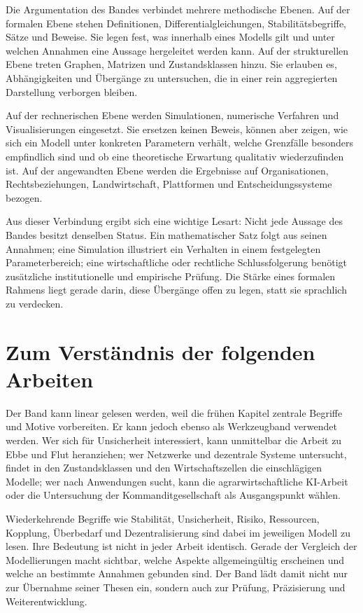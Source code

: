 \documentclass[a4paper, 12pt, twoside, openright]{report}
\theoremstyle{definition}
\theoremstyle{definition}
\begin{document}
Die Argumentation des Bandes verbindet mehrere methodische Ebenen. Auf der
formalen Ebene stehen Definitionen, Differentialgleichungen, Stabilitätsbegriffe,
Sätze und Beweise. Sie legen fest, was innerhalb eines Modells gilt und unter
welchen Annahmen eine Aussage hergeleitet werden kann. Auf der strukturellen
Ebene treten Graphen, Matrizen und Zustandsklassen hinzu. Sie erlauben es,
Abhängigkeiten und Übergänge zu untersuchen, die in einer rein aggregierten
Darstellung verborgen bleiben.

Auf der rechnerischen Ebene werden Simulationen, numerische Verfahren und
Visualisierungen eingesetzt. Sie ersetzen keinen Beweis, können aber zeigen,
wie sich ein Modell unter konkreten Parametern verhält, welche Grenzfälle
besonders empfindlich sind und ob eine theoretische Erwartung qualitativ
wiederzufinden ist. Auf der angewandten Ebene werden die Ergebnisse auf
Organisationen, Rechtsbeziehungen, Landwirtschaft, Plattformen und
Entscheidungssysteme bezogen.

Aus dieser Verbindung ergibt sich eine wichtige Lesart: Nicht jede Aussage des
Bandes besitzt denselben Status. Ein mathematischer Satz folgt aus seinen
Annahmen; eine Simulation illustriert ein Verhalten in einem festgelegten
Parameterbereich; eine wirtschaftliche oder rechtliche Schlussfolgerung benötigt
zusätzliche institutionelle und empirische Prüfung. Die Stärke eines formalen
Rahmens liegt gerade darin, diese Übergänge offen zu legen, statt sie sprachlich
zu verdecken.

\section{Zum Verständnis der folgenden Arbeiten}

Der Band kann linear gelesen werden, weil die frühen Kapitel zentrale Begriffe
und Motive vorbereiten. Er kann jedoch ebenso als Werkzeugband verwendet werden.
Wer sich für Unsicherheit interessiert, kann unmittelbar die Arbeit zu Ebbe und
Flut heranziehen; wer Netzwerke und dezentrale Systeme untersucht, findet in den
Zustandsklassen und den Wirtschaftszellen die einschlägigen Modelle; wer nach
Anwendungen sucht, kann die agrarwirtschaftliche KI-Arbeit oder die Untersuchung
der Kommanditgesellschaft als Ausgangspunkt wählen.

Wiederkehrende Begriffe wie Stabilität, Unsicherheit, Risiko, Ressourcen,
Kopplung, Überbedarf und Dezentralisierung sind dabei im jeweiligen Modell zu
lesen. Ihre Bedeutung ist nicht in jeder Arbeit identisch. Gerade der Vergleich
der Modellierungen macht sichtbar, welche Aspekte allgemeingültig erscheinen und
welche an bestimmte Annahmen gebunden sind. Der Band lädt damit nicht nur zur
Übernahme seiner Thesen ein, sondern auch zur Prüfung, Präzisierung und
Weiterentwicklung.
\end{document}
